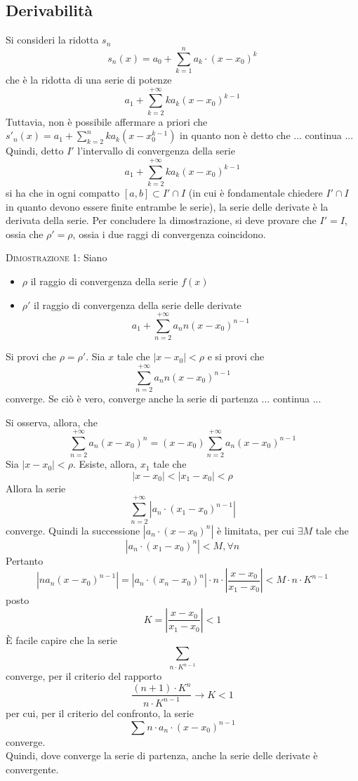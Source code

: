 \documentclass[a4paper]{extarticle}
\begin{document}
\vspace{1em}
\subsection{Derivabilità}
Si consideri la ridotta $s_n$
\[s_n(x) = a_0 + \sum_{k=1}^n a_k \cdot (x-x_0)^k\]
che è la ridotta di una serie di potenze
\[a_1 + \sum_{k=2}^{+\infty} k a_k (x-x_0)^{k-1}\]
Tuttavia, non è possibile affermare a priori che
$s'_n(x) = a_1 + \sum_{k=2}^n k a_k (x-x_0^{k-1})$
in quanto non è detto che ... continua ...\\
Quindi, detto $I'$ l'intervallo di convergenza della serie
\[a_1 + \sum_{k=2}^{+\infty} k a_k (x-x_0)^{k-1}\]
si ha che in ogni compatto $[a,b] \subset I' \cap I$ (in cui è fondamentale chiedere $I' \cap I$ in quanto devono essere finite entrambe le serie), la serie delle derivate è la derivata della serie. Per concludere la dimostrazione, si deve provare che $I'=I$, ossia che $\rho'=\rho$, ossia i due raggi di convergenza coincidono.

\vspace{2em}
\noindent
\normalfont \normalsize
\textsc{Dimostrazione 1}: Siano
\begin{itemize}
    \item $\rho$ il raggio di convergenza della serie $f(x)$
    \item $\rho'$ il raggio di convergenza della serie delle derivate
    \[a_1 + \sum_{n=2}^{+\infty} a_n n (x-x_0)^{n-1}\]
\end{itemize}
Si provi che $\rho=\rho'$. Sia $x$ tale che $\left \vert x - x_0 \right \vert < \rho$ e si provi che
\[\sum_{n=2}^{+\infty} a_n n (x-x_0)^{n-1}\]
converge. Se ciò è vero, converge anche la serie di partenza ... continua ...

\vspace{1em}
\noindent
Si osserva, allora, che
\[\sum_{n=2}^{+\infty} a_n (x-x_0)^n = (x-x_0) \sum_{n=2}^{+\infty} a_n (x-x_0)^{n-1}\]
Sia $\left \vert x - x_0 \right \vert < \rho$. Esiste, allora, $x_1$ tale che
\[\left \vert x - x_0 \right \vert < \left \vert x_1 - x_0 \right \vert < \rho\]
Allora la serie
\[\sum_{n=2}^{+\infty} \left \vert a_n \cdot (x_1 - x_0)^{n-1} \right \vert\]
converge. Quindi la successione $\left \vert a_n \cdot (x-x_0)^n \right \vert$ è limitata, per cui $\exists M$ tale che
\[\left \vert a_n \cdot (x_1-x_0)^n \right \vert < M, \forall n\]
Pertanto
\[\left \vert n a_n (x-x_0)^{n-1} \right \vert = \left \vert a_n \cdot (x_n-x_0)^n \right \vert \cdot n \cdot \left \vert \frac{x-x_0}{x_1-x_0} \right \vert < M \cdot n \cdot K^{n-1}\]
posto
\[K=\left \vert \frac{x-x_0}{x_1-x_0} \right \vert < 1\]
È facile capire che la serie
\[\sum_{n \cdot K^{n-1}}\]
converge, per il criterio del rapporto
\[\frac{(n+1) \cdot K^n}{n \cdot K^{n-1}} \rightarrow K < 1\]
per cui, per il criterio del confronto, la serie
\[\sum n \cdot a_n \cdot (x-x_0)^{n-1}\]
converge.\\
Quindi, dove converge la serie di partenza, anche la serie delle derivate è convergente.
\end{document}
